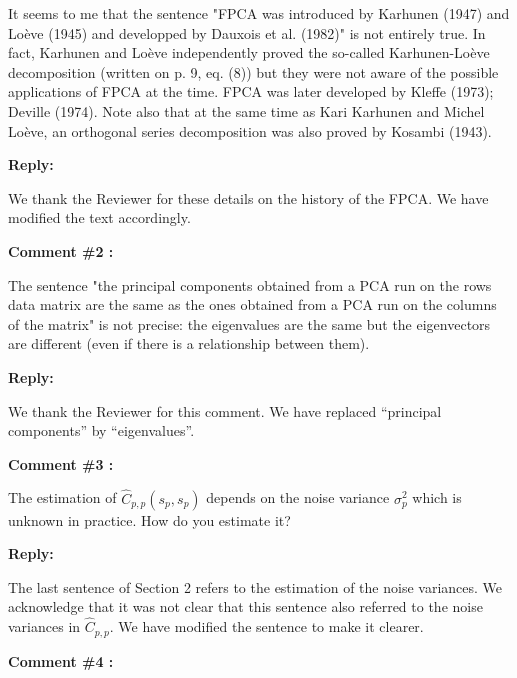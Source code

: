 \documentclass[11pt]{article}
\begin{document}
It seems to me that the sentence "FPCA was introduced by Karhunen (1947) and Loève (1945) and developped by Dauxois et al. (1982)" is not entirely true. In fact, Karhunen and Loève independently proved the so-called Karhunen-Loève decomposition (written on p. 9, eq. (8)) but they were not aware of the possible applications of FPCA at the time. FPCA was later developed by Kleﬀe (1973); Deville (1974). Note also that at the same time as Kari Karhunen and Michel Loève, an orthogonal series decomposition was also proved by Kosambi (1943).

\medskip

\normalfont

\textbf{Reply:} 

We thank the Reviewer for these details on the history of the FPCA. We have modified the text accordingly.

\bigskip

\itshape

\textbf{Comment \#2 :}

The sentence "the principal components obtained from a PCA run on
the rows data matrix are the same as the ones obtained from a PCA run on the
columns of the matrix" is not precise: the eigenvalues are the same but the eigenvectors are diﬀerent (even if there is a relationship between them).

\medskip

\normalfont

\textbf{Reply:}

We thank the Reviewer for this comment. We have replaced ``principal components'' by ``eigenvalues''.

\bigskip

\itshape


\textbf{Comment \#3 :}

The estimation of $\widehat{C}_{p,p}(s_p,s_p)$ depends on the noise variance $\sigma^2_p$ which is unknown in practice. How do you estimate it?

\medskip

\normalfont

\textbf{Reply:}

The last sentence of Section 2 refers to the estimation of the noise variances. We acknowledge that it was not clear that this sentence also referred to the noise variances in $\widehat{C}_{p, p}$. We have modified the sentence to make it clearer.

\bigskip


\itshape


\textbf{Comment \#4 :}
\end{document}
